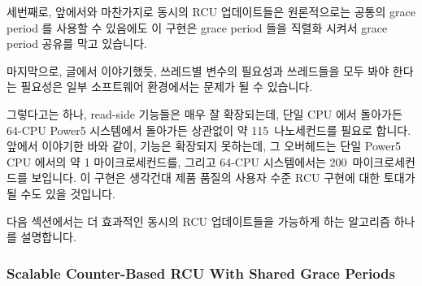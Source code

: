 세번째로, 앞에서와 마찬가지로 동시의 RCU 업데이트들은 원론적으로는 공통의 grace
period 를 사용할 수 있음에도 이 구현은 grace period 들을 직렬화 시켜서 grace
period 공유를 막고 있습니다.

마지막으로, 글에서 이야기했듯, 쓰레드별 변수의 필요성과 쓰레드들을 모두 봐야
한다는 필요성은 일부 소프트웨어 환경에서는 문제가 될 수 있습니다.
\iffalse

This implementation still has several shortcomings.
First, the need to flip \co{rcu_idx} twice imposes substantial overhead
on updates, especially if there are large numbers of threads.

Second, \co{synchronize_rcu()} must now examine a number of variables
that increases linearly with the number of threads, imposing substantial
overhead on applications with large numbers of threads.

Third, as before, although concurrent RCU updates could in principle
be satisfied by a common grace period, this implementation serializes
grace periods, preventing grace-period sharing.

Finally, as noted in the text, the need for per-thread variables
and for enumerating threads may be problematic in some software
environments.
\fi

그렇다고는 하나, read-side 기능들은 매우 잘 확장되는데, 단일 CPU 에서 돌아가든
64-CPU Power5 시스템에서 돌아가든 상관없이 약 115~나노세컨드를 필요로 합니다.
앞에서 이야기한 바와 같이,  기능은 확장되지 못하는데, 그
오버헤드는 단일 Power5 CPU 에서의 약 1 마이크로세컨드를, 그리고 64-CPU
시스템에서는 200~마이크로세컨드를 보입니다.
이 구현은 생각건대 제품 품질의 사용자 수준 RCU 구현에 대한 토대가 될 수도 있을
것입니다.

다음 섹션에서는 더 효과적인 동시의 RCU 업데이트들을 가능하게 하는 알고리즘
하나를 설명합니다.
\iffalse

That said, the read-side primitives scale very nicely, requiring about
115~nanoseconds regardless of whether running on a single-CPU or a 64-CPU
Power5 system.
As noted above, the \co{synchronize_rcu()} primitive does not scale,
ranging in overhead from almost a microsecond on a single Power5 CPU
up to almost 200~microseconds on a 64-CPU system.
This implementation could conceivably form the basis for a
production-quality user-level RCU implementation.

The next section describes an algorithm permitting more efficient
concurrent RCU updates.
\fi

\subsubsection{Scalable Counter-Based RCU With Shared Grace Periods}
\label{defer:Scalable Counter-Based RCU With Shared Grace Periods}

